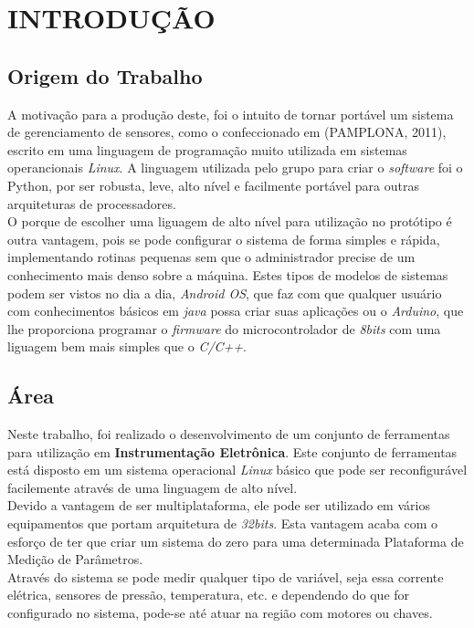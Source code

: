 \documentclass[a4paper, 12pt]{article}
\begin{document}
\section{INTRODUÇÃO}
\vspace{0.5cm}
\subsection{Origem do Trabalho}

\indent\indent A motivação para a produção deste, foi o intuito de tornar portável um sistema de gerenciamento de sensores, como o confeccionado em (PAMPLONA, 2011),
 escrito em uma linguagem de programação muito utilizada em sistemas operancionais \textit{Linux}. A linguagem utilizada pelo grupo para criar o \textit{software} foi o Python,
 por ser robusta, leve, alto nível e facilmente portável para outras arquiteturas de processadores. 
\\
\indent O porque de escolher uma liguagem de alto nível para utilização no protótipo é outra vantagem, pois se pode configurar o sistema de forma simples
 e rápida, implementando rotinas pequenas sem que o administrador precise de um conhecimento mais denso sobre a máquina. Estes tipos de modelos de sistemas 
podem ser vistos no dia a dia, \textit{Android OS}, que faz com que qualquer usuário com conhecimentos básicos em \textit{java} possa criar suas aplicações ou o \textit{Arduino}, que 
lhe proporciona programar o \textit{firmware} do microcontrolador de \textit{8bits} com uma liguagem bem mais simples que o \textit{C/C++}.

\subsection{Área}
\indent\indent Neste trabalho, foi realizado o desenvolvimento de um conjunto de ferramentas para utilização em \textbf{Instrumentação Eletrônica}. Este conjunto de 
ferramentas está disposto em um sistema operacional \textit{Linux} básico que pode ser reconfigurável facilemente através de uma linguagem de alto nível.
\\
\indent Devido a vantagem de ser multiplataforma, ele pode ser utilizado em vários equipamentos que portam arquitetura de \textit{32bits}. Esta vantagem acaba com o
 esforço de ter que criar um sistema do zero para uma determinada Plataforma de Medição de Parâmetros.
\\
\indent	Através do sistema se pode medir qualquer tipo de variável, seja essa corrente elétrica, sensores de pressão, temperatura, etc. e dependendo do que 
for configurado no sistema, pode-se até atuar na região com motores ou chaves.
\end{document}
